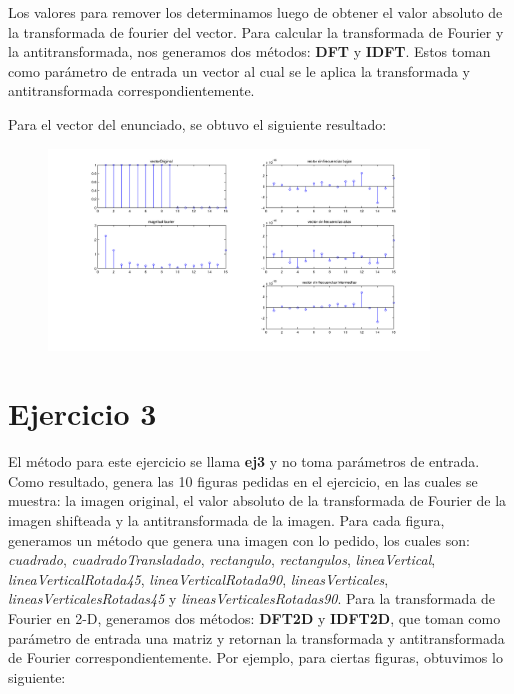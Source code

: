 \documentclass{article}
\begin{document}
Los valores para remover los determinamos luego de obtener el valor absoluto de la transformada de fourier del vector. Para calcular la transformada de Fourier y la antitransformada, nos generamos dos métodos: \textbf{DFT} y \textbf{IDFT}. Estos toman como parámetro de entrada un vector al cual se le aplica la transformada y antitransformada correspondientemente. 

Para el vector del enunciado, se obtuvo el siguiente resultado:

 \begin{figure}[H]
    \includegraphics[width=0.9\textwidth]{ej2.png}
\end{figure}

\section*{Ejercicio 3}

El método para este ejercicio se llama \textbf{ej3} y no toma parámetros de entrada. Como resultado, genera las 10 figuras pedidas en el ejercicio, en las cuales se muestra: la imagen original, el valor absoluto de la transformada de Fourier de la imagen shifteada y la antitransformada de la imagen. Para cada figura, generamos un método que genera una imagen con lo pedido, los cuales son: \textit{cuadrado}, \textit{cuadradoTransladado}, \textit{rectangulo}, \textit{rectangulos}, \textit{lineaVertical}, \textit{lineaVerticalRotada45}, \textit{lineaVerticalRotada90}, \textit{lineasVerticales}, \textit{lineasVerticalesRotadas45} y \textit{lineasVerticalesRotadas90}. Para la transformada de Fourier en 2-D, generamos dos métodos: \textbf{DFT2D} y \textbf{IDFT2D}, que toman como parámetro de entrada una matriz y retornan la transformada y antitransformada de Fourier correspondientemente. Por ejemplo, para ciertas figuras, obtuvimos lo siguiente:
\end{document}

